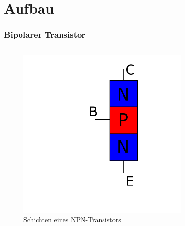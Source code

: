 

\subtitle{Technik Klasse A 06: \\
  Transistor \& Verstärker \\[2em]}
\date{Stand 23.01.2017}


\section*{Aufbau}

\begin{frame}
  \frametitle{Bipolarer Transistor}
  \begin{columns}
    \begin{figure}
      \includegraphics[width=\textwidth,height=.5\textheight,keepaspectratio]{a06/NPN_hlb.png}
      \caption{Schichten eines NPN-Transistors}
    \end{figure}
    \begin{figure}

\end{figure}
\end{columns}
\end{frame}

